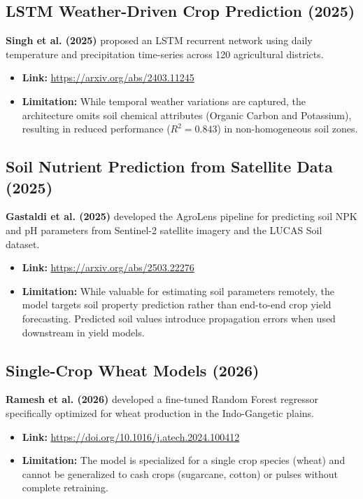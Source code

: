 \documentclass[11pt,a4paper]{article}
\begin{document}
\subsection{LSTM Weather-Driven Crop Prediction (2025)}
\textbf{Singh et al. (2025)} \cite{singh2025deep} proposed an LSTM recurrent network using daily temperature and precipitation time-series across 120 agricultural districts.
\begin{itemize}
    \item \textbf{Link:} \url{https://arxiv.org/abs/2403.11245}
    \item \textbf{Limitation:} While temporal weather variations are captured, the architecture omits soil chemical attributes (Organic Carbon and Potassium), resulting in reduced performance ($R^2 = 0.843$) in non-homogeneous soil zones.
\end{itemize}

\subsection{Soil Nutrient Prediction from Satellite Data (2025)}
\textbf{Gastaldi et al. (2025)} \cite{gastaldi2025agrolens} developed the AgroLens pipeline for predicting soil NPK and pH parameters from Sentinel-2 satellite imagery and the LUCAS Soil dataset.
\begin{itemize}
    \item \textbf{Link:} \url{https://arxiv.org/abs/2503.22276}
    \item \textbf{Limitation:} While valuable for estimating soil parameters remotely, the model targets soil property prediction rather than end-to-end crop yield forecasting. Predicted soil values introduce propagation errors when used downstream in yield models.
\end{itemize}

\subsection{Single-Crop Wheat Models (2026)}
\textbf{Ramesh et al. (2026)} \cite{ramesh2026single} developed a fine-tuned Random Forest regressor specifically optimized for wheat production in the Indo-Gangetic plains.
\begin{itemize}
    \item \textbf{Link:} \url{https://doi.org/10.1016/j.atech.2024.100412}
    \item \textbf{Limitation:} The model is specialized for a single crop species (wheat) and cannot be generalized to cash crops (sugarcane, cotton) or pulses without complete retraining.
\end{itemize}
\end{document}
